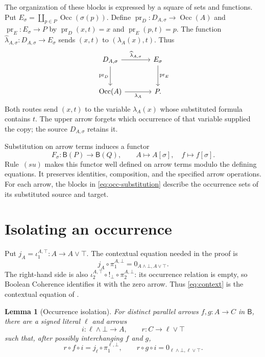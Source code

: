 \documentclass[11pt]{article}
\newtheorem{lemma}[theorem]{Lemma}
\newcommand{\B}{\mathsf B}
\newcommand{\Occ}{\operatorname{Occ}}
\begin{document}
The organization of these blocks is expressed by a square of sets and
functions. Put $E_\sigma=\coprod_{p\in P}\Occ(\sigma(p))$.
Define $\operatorname{pr}_D:D_{A,\sigma}\to\Occ(A)$ and
$\operatorname{pr}_E:E_\sigma\to P$ by
$\operatorname{pr}_D(x,t)=x$ and $\operatorname{pr}_E(p,t)=p$.
The function
$\widehat\lambda_{A,\sigma}:D_{A,\sigma}\to E_\sigma$ sends
$(x,t)$ to $(\lambda_A(x),t)$. Thus
\begin{equation}
\begin{tikzcd}[column sep=large,row sep=large]
 D_{A,\sigma}\arrow[r,"\widehat\lambda_{A,\sigma}"]
   \arrow[d,"\operatorname{pr}_D"']
   &E_\sigma\arrow[d,"\operatorname{pr}_E"]\\
 \Occ(A)\arrow[r,"\lambda_A"']&P.
\end{tikzcd}
\label{eq:block-square}
\end{equation}
Both routes send $(x,t)$ to the variable $\lambda_A(x)$ whose
substituted formula contains $t$. The upper arrow forgets which
occurrence of that variable supplied the copy; the source $D_{A,\sigma}$
retains it.

Substitution on arrow terms induces a functor
\[
 F_\sigma:\B(P)\longrightarrow\B(Q),\qquad
 A\longmapsto A[\sigma],\quad f\longmapsto f[\sigma].
\]
Rule~$(su)$ makes this functor well defined on arrow terms modulo the
defining equations. It preserves identities, composition, and the
specified arrow operations. For each arrow, the blocks in
\eqref{eq:occ-substitution} describe the occurrence sets of its
substituted source and target.

\section{Isolating an occurrence}\label{sec:isolation}

Put $j_A=\iota_1^{A,\top}:A\to A\vee\top$. The contextual equation
needed in the proof is
\begin{equation}
 j_A\circ\pi_1^{A,\bot}
   =0_{A\wedge\bot,A\vee\top}.
 \tag{$K_A$}\label{eq:context}
\end{equation}
The right-hand side is also
$\iota_2^{A,\top}\circ!_\bot\circ\pi_2^{A,\bot}$: its occurrence
relation is empty, so Boolean Coherence identifies it with the zero
arrow. Thus \eqref{eq:context} is the contextual equation of
\cite[\S9.7, pp.~215--216]{DP}.

\begin{lemma}[Occurrence isolation]\label{lem:isolation}
For distinct parallel arrows $f,g:A\to C$ in $\B$, there are a
signed literal $\ell$ and arrows
\[
 i:\ell\wedge\bot\longrightarrow A,
 \qquad r:C\longrightarrow\ell\vee\top
\]
such that, after possibly interchanging $f$ and $g$,
\[
 r\circ f\circ i=j_\ell\circ\pi_1^{\ell,\bot},
 \qquad
 r\circ g\circ i=0_{\ell\wedge\bot,\ell\vee\top}.
\]
\end{lemma}
\end{document}
